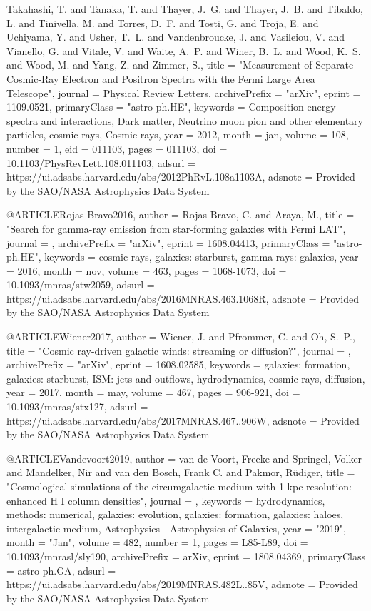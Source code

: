 \documentclass[useAMS,usenatbib]{mnras}
\begin{document}
{{{{{{{{	{Takahashi}, T. and {Tanaka}, T. and {Thayer}, J.~G. and {Thayer}, J.~B. and 
	{Tibaldo}, L. and {Tinivella}, M. and {Torres}, D.~F. and {Tosti}, G. and 
	{Troja}, E. and {Uchiyama}, Y. and {Usher}, T.~L. and {Vandenbroucke}, J. and 
	{Vasileiou}, V. and {Vianello}, G. and {Vitale}, V. and {Waite}, A.~P. and 
	{Winer}, B.~L. and {Wood}, K.~S. and {Wood}, M. and {Yang}, Z. and 
	{Zimmer}, S.},
    title = "{Measurement of Separate Cosmic-Ray Electron and Positron Spectra with the Fermi Large Area Telescope}",
  journal = {Physical Review Letters},
archivePrefix = "arXiv",
   eprint = {1109.0521},
 primaryClass = "astro-ph.HE",
 keywords = {Composition energy spectra and interactions, Dark matter, Neutrino muon pion and other elementary particles, cosmic rays, Cosmic rays},
     year = 2012,
    month = jan,
   volume = 108,
   number = 1,
      eid = {011103},
    pages = {011103},
      doi = {10.1103/PhysRevLett.108.011103},
   adsurl = {https://ui.adsabs.harvard.edu/abs/2012PhRvL.108a1103A},
  adsnote = {Provided by the SAO/NASA Astrophysics Data System}
}

@ARTICLE{Rojas-Bravo2016,
   author = {{Rojas-Bravo}, C. and {Araya}, M.},
    title = "{Search for gamma-ray emission from star-forming galaxies with Fermi LAT}",
  journal = {\mnras},
archivePrefix = "arXiv",
   eprint = {1608.04413},
 primaryClass = "astro-ph.HE",
 keywords = {cosmic rays, galaxies: starburst, gamma-rays: galaxies},
     year = 2016,
    month = nov,
   volume = 463,
    pages = {1068-1073},
      doi = {10.1093/mnras/stw2059},
   adsurl = {https://ui.adsabs.harvard.edu/abs/2016MNRAS.463.1068R},
  adsnote = {Provided by the SAO/NASA Astrophysics Data System}
}

@ARTICLE{Wiener2017,
   author = {{Wiener}, J. and {Pfrommer}, C. and {Oh}, S.~P.},
    title = "{Cosmic ray-driven galactic winds: streaming or diffusion?}",
  journal = {\mnras},
archivePrefix = "arXiv",
   eprint = {1608.02585},
 keywords = {galaxies: formation, galaxies: starburst, ISM: jets and outflows, hydrodynamics, cosmic rays, diffusion},
     year = 2017,
    month = may,
   volume = 467,
    pages = {906-921},
      doi = {10.1093/mnras/stx127},
   adsurl = {https://ui.adsabs.harvard.edu/abs/2017MNRAS.467..906W},
  adsnote = {Provided by the SAO/NASA Astrophysics Data System}
}

@ARTICLE{Vandevoort2019,
       author = {{van de Voort}, Freeke and {Springel}, Volker and {Mandelker}, Nir and
         {van den Bosch}, Frank C. and {Pakmor}, R{\"u}diger},
        title = "{Cosmological simulations of the circumgalactic medium with 1 kpc resolution: enhanced H I column densities}",
      journal = {\mnras},
     keywords = {hydrodynamics, methods: numerical, galaxies: evolution, galaxies: formation, galaxies: haloes, intergalactic medium, Astrophysics - Astrophysics of Galaxies},
         year = "2019",
        month = "Jan",
       volume = {482},
       number = {1},
        pages = {L85-L89},
          doi = {10.1093/mnrasl/sly190},
archivePrefix = {arXiv},
       eprint = {1808.04369},
 primaryClass = {astro-ph.GA},
       adsurl = {https://ui.adsabs.harvard.edu/abs/2019MNRAS.482L..85V},
      adsnote = {Provided by the SAO/NASA Astrophysics Data System}
}



}}}}}}
\end{document}
